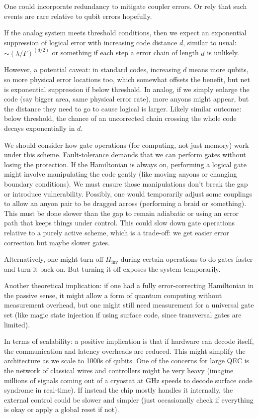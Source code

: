 \documentclass[11pt]{article}
\begin{document}
One could incorporate redundancy to mitigate coupler errors. Or rely that such events are rare relative to qubit errors hopefully.

If the analog system meets threshold conditions, then we expect an exponential suppression of logical error with increasing code distance $d$, similar to usual: $\sim (\lambda/\Gamma)^{(d/2)}$ or something if each step a error chain of length $d$ is unlikely.

However, a potential caveat: in standard codes, increasing $d$ means more qubits, so more physical error locations too, which somewhat offsets the benefit, but net is exponential suppression if below threshold. In analog, if we simply enlarge the code (say bigger area, same physical error rate), more anyons might appear, but the distance they need to go to cause logical is larger. Likely similar outcome: below threshold, the chance of an uncorrected chain crossing the whole code decays exponentially in $d$.

We should consider how gate operations (for computing, not just memory) work under this scheme. Fault-tolerance demands that we can perform gates without losing the protection. If the Hamiltonian is always on, performing a logical gate might involve manipulating the code gently (like moving anyons or changing boundary conditions). We must ensure those manipulations don't break the gap or introduce vulnerability. Possibly, one would temporarily adjust some couplings to allow an anyon pair to be dragged across (performing a braid or something). This must be done slower than the gap to remain adiabatic or using an error path that keeps things under control. This could slow down gate operations relative to a purely active scheme, which is a trade-off: we get easier error correction but maybe slower gates.

Alternatively, one might turn off $H_{\mathrm{inv}}$ during certain operations to do gates faster and turn it back on. But turning it off exposes the system temporarily.

Another theoretical implication: if one had a fully error-correcting Hamiltonian in the passive sense, it might allow a form of quantum computing without measurement overhead, but one might still need measurement for a universal gate set (like magic state injection if using surface code, since transversal gates are limited).

In terms of scalability: a positive implication is that if hardware can decode itself, the communication and latency overheads are reduced. This might simplify the architecture as we scale to 1000s of qubits. One of the concerns for large QEC is the network of classical wires and controllers might be very heavy (imagine millions of signals coming out of a cryostat at GHz speeds to decode surface code syndrome in real-time). If instead the chip mostly handles it internally, the external control could be slower and simpler (just occasionally check if everything is okay or apply a global reset if not).
\end{document}

